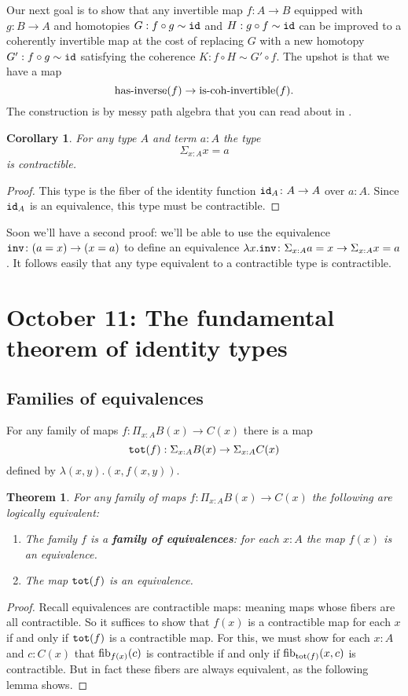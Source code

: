 \documentclass{amsart}
\theoremstyle{theorem}
\newtheorem*{thm}{Theorem}
\newtheorem*{cor}{Corollary}
\theoremstyle{definition}
\theoremstyle{remark}
\newcommand{\0}{\mathbbe{0}}
\newcommand{\1}{\mathbbe{1}}
\newcommand{\2}{\mathbbe{2}}
\newcommand{\3}{\mathbbe{3}}
\newcommand{\4}{\mathbbe{4}}
\newcommand{\term}[1]{{\textup{\texttt{#1}}}}
\newcommand{\type}[1]{{\textup{#1}}}
\newcommand{\id}{\term{id}}
\newcommand{\inv}{\term{inv}}
\newcommand{\is}[1]{\type{is-{#1}}}
\newcommand{\fib}{\type{fib}}
\begin{document}
Our next goal is to show that any invertible map $f \colon A \to B$ equipped with $g \colon B \to A$ and homotopies $G : f \circ g \sim \id$ and $H : g \circ f \sim \id$ can be improved to a coherently invertible map at the cost of replacing $G$ with a new homotopy $G'  : f \circ g \sim \id$ satisfying the coherence $K : f \circ H \sim G' \circ f$. The upshot is that we have a map
\[ \type{has-inverse}(f) \to \is{coh-invertible}(f).\]
The construction is by messy path algebra that you can read about in \cite[\S 10.4]{Rijke}.



\begin{cor} For any type $A$ and term $a :A$ the type
\[ \Sigma_{x:A} x =a\] is contractible.
\end{cor}
\begin{proof}
This type is the fiber of the identity function $\id_A \colon A \to A$ over $a :A$. Since $\id_A$ is an equivalence, this type must be contractible.
\end{proof}

Soon we'll have a second proof: we'll be able to use the equivalence $\inv \colon (a =x) \to (x =a)$ to define an equivalence $\lambda x. \inv \colon \Sigma_{x:A} a =x \to \Sigma_{x:A} x =a$. It follows easily that any type equivalent to a contractible type is contractible.

\section*{October 11: The fundamental theorem of identity types}

 \subsection*{Families of equivalences}
 
For any family of maps $f \colon \Pi_{x:A} B(x) \to C(x)$ there is a map
\[ \term{tot}(f) : \Sigma_{x:A} B(x) \to \Sigma_{x:A}C(x)\]
defined by $\lambda(x,y).(x,f(x,y))$. 

\begin{thm} For any  family of maps $f \colon \Pi_{x:A} B(x) \to C(x)$ the following are logically equivalent:
\begin{enumerate}
\item The family $f$ is a \textbf{family of equivalences}: for each $x :A$ the map $f(x)$ is an equivalence.
\item The map $\term{tot}(f)$ is an equivalence.
\end{enumerate}
\end{thm}
\begin{proof}
Recall equivalences are contractible maps: meaning maps whose fibers are all contractible. So it suffices to show that $f(x)$ is a contractible map for each $x$ if and only if $\term{tot}(f)$ is a contractible map. For this, we must show for each $x :A$ and $c : C(x)$ that $\fib_{f(x)}(c)$ is contractible if and only if $\fib_{\type{tot}(f)}(x,c)$ is contractible. But in fact these fibers are always equivalent, as the following lemma shows.
\end{proof}
\end{document}

